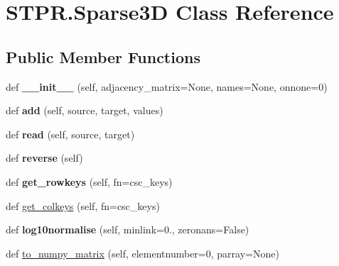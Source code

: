 \hypertarget{classSTPR_1_1Sparse3D}{}\section{S\+T\+P\+R.\+Sparse3D Class Reference}
\label{classSTPR_1_1Sparse3D}
\subsection*{Public Member Functions}
\begin{DoxyCompactItemize}
\item 
\mbox{\label{classSTPR_1_1Sparse3D_a5cd2f5219647a546d499b15070a8baea}} 
def {\bfseries \+\_\+\+\_\+init\+\_\+\+\_\+} (self, adjacency\+\_\+matrix=None, names=None, onnone=0)
\item 
\mbox{\label{classSTPR_1_1Sparse3D_aff961f2a4ff5f45ad491dddfde3c023b}} 
def {\bfseries add} (self, source, target, values)
\item 
\mbox{\label{classSTPR_1_1Sparse3D_afeb84c06d9579421012decb5c25a5db8}} 
def {\bfseries read} (self, source, target)
\item 
\mbox{\label{classSTPR_1_1Sparse3D_a9513e88514c6d7ae4f66089646edf67d}} 
def {\bfseries reverse} (self)
\item 
\mbox{\label{classSTPR_1_1Sparse3D_a0666a9cd963240af5ed633e506a0cf5e}} 
def {\bfseries get\+\_\+rowkeys} (self, fn=\textquotesingle{}csc\+\_\+keys\textquotesingle{})
\item 
def \mbox{\hyperlink{classSTPR_1_1Sparse3D_a8d672996a1916e3d660778962c20bfcf}{get\+\_\+colkeys}} (self, fn=\textquotesingle{}csc\+\_\+keys\textquotesingle{})
\item 
\mbox{\label{classSTPR_1_1Sparse3D_a311c2374450de54545d534eee53e5f9a}} 
def {\bfseries log10normalise} (self, minlink=0., zeronans=False)
\item 
def \mbox{\hyperlink{classSTPR_1_1Sparse3D_a1254a87d6986bbfb8e86270bde3856b6}{to\+\_\+numpy\+\_\+matrix}} (self, elementnumber=0, parray=None)
\item 
\mbox{\label{classSTPR_1_1Sparse3D_a6c0c03e9c6035490d02ee346e3244a97}} 

\end{DoxyCompactItemize}
